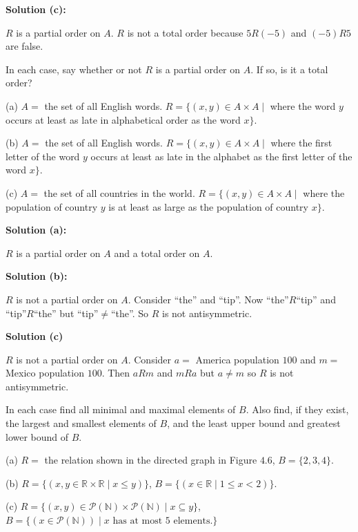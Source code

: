 \textbf{Solution (c):}

$R$ is a partial order on $A$.
$R$ is not a total order because $5R(-5)$ and $(-5)R5$ are false.

\begin{tcolorbox}[title=Problem 2, breakable]
    In each case, say whether or not $R$ is a partial order on $A$. 
    If so, is it a total order? 

    (a) $A =$ the set of all English words.  
    $R = \{(x, y) \in A \times A \mid$  
    where the word $y$ occurs at least as late in alphabetical order as the word $x$$\}$.

    (b) $A =$ the set of all English words.  
    $R = \{(x, y) \in A \times A \mid$  
    where the first letter of the word $y$ occurs at least as late in the alphabet as the first letter of the word $x$$\}$.

    (c) $A =$ the set of all countries in the world.  
    $R = \{(x, y) \in A \times A \mid$  
    where the population of country $y$ is at least as large as the population of country $x$$\}$.
\end{tcolorbox}

\textbf{Solution (a):}

$R$ is a partial order on $A$ and a total order on $A$.

\textbf{Solution (b):}

$R$ is not a partial order on $A$.
Consider ``the'' and ``tip''.
Now ``the''$R$``tip'' and ``tip''$R$``the'' but ``tip''$\not= $``the''.
So $R$ is not antisymmetric.

\textbf{Solution (c)}

$R$ is not a partial order on $A$.
Consider $a =$ America population $100$ and $m =$  Mexico population $100$.
Then $aRm$ and $mRa$ but $a \not= m$ so $R$ is not antisymmetric.

\begin{tcolorbox}[title=Problem 3, breakable]
    In each case find all minimal and maximal elements of $B$.
    Also find, if they exist, the largest and smallest elements of $B$,
    and the least upper bound and greatest lower bound of $B$.

    (a) $R =$ the relation shown in the directed graph in Figure $4.6$,
        $B = \{2, 3, 4\}$.

    (b) $R = \{(x, y \in \mathbb{\mathbb{R}} \times \mathbb{\mathbb{R}} \mid x \le y)\}$,
        $B = \{(x \in \mathbb{R} \mid 1 \le x < 2)\}$.

    (c) $R = \{(x, y) \in \mathcal{P}(\mathbb{N}) \times \mathcal{P}(\mathbb{N}) \mid x \subseteq y\}$,
        $B = \{(x \in \mathcal{P}(\mathbb{N})) \mid \text{$x$ has at most $5$ elements.}\}$
\end{tcolorbox}

